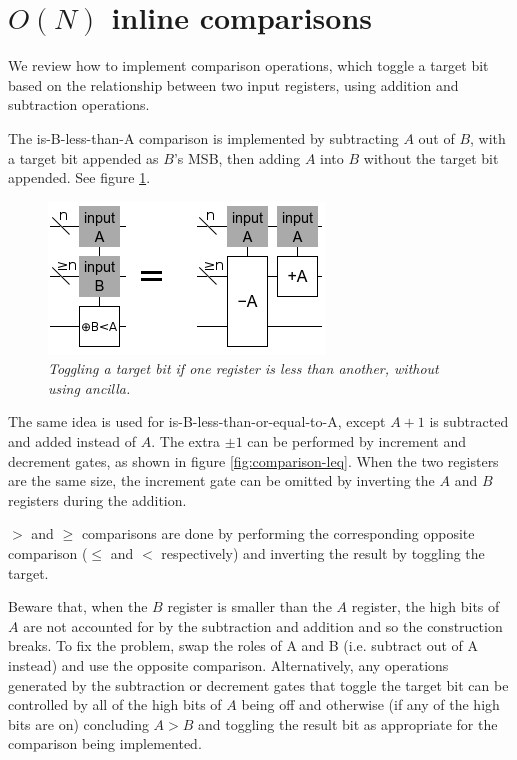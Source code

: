 \documentclass[twocolumn]{article}
\begin{document}
\section{$O(N)$ inline comparisons}

We review how to implement comparison operations, which toggle a target bit based on the relationship between two input registers, using addition and subtraction operations.

The is-B-less-than-A comparison is implemented by subtracting $A$ out of $B$, with a target bit appended as $B$'s MSB, then adding $A$ into $B$ without the target bit appended.
See figure \ref{fig:comparison-less}.

\begin{figure}
  \centering
  \includegraphics[width=\linewidth]{assets/comparison-less.png}
  \caption{\em Toggling a target bit if one register is less than another, without using ancilla.}
  \label{fig:comparison-less}
\end{figure}

The same idea is used for is-B-less-than-or-equal-to-A, except $A+1$ is subtracted and added instead of $A$.
The extra $\pm 1$ can be performed by increment and decrement gates, as shown in figure \ref{fig:comparison-leq}.
When the two registers are the same size, the increment gate can be omitted by inverting the $A$ and $B$ registers during the addition.

$>$ and $\geq$ comparisons are done by performing the corresponding opposite comparison ($\leq$ and $<$ respectively) and inverting the result by toggling the target.

Beware that, when the $B$ register is smaller than the $A$ register, the high bits of $A$ are not accounted for by the subtraction and addition and so the construction breaks.
To fix the problem, swap the roles of A and B (i.e. subtract out of A instead) and use the opposite comparison.
Alternatively, any operations generated by the subtraction or decrement gates that toggle the target bit can be controlled by all of the high bits of $A$ being off and otherwise (if any of the high bits are on) concluding $A>B$ and toggling the result bit as appropriate for the comparison being implemented.
\end{document}
